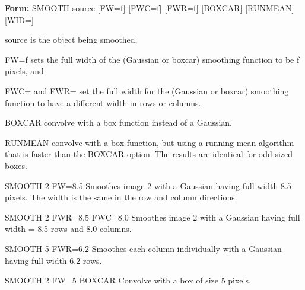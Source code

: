 {\newpage\clearpage
{}%
\begin{command}
  \item[\textbf{Form: }SMOOTH source {[FW=f]} {[FWC=f]} {[FWR=f]} 
       {[BOXCAR]} {[RUNMEAN]} {[WID=]}\hfill]{}
  \item[source]{is the object being smoothed,}
  \item[FW=f]{sets the full width of the (Gaussian or boxcar)
       smoothing function to be f pixels, and}
  \item[FWC= and FWR=]{set the full width for the (Gaussian or boxcar)
       smoothing function to have a different width in rows or columns.}
  \item[BOXCAR]{convolve with a box function instead of a Gaussian.}
  \item[RUNMEAN]{convolve with a box function, but using a
       running-mean algorithm that is faster than the BOXCAR option. 
       The results are identical for odd-sized boxes.}
\end{command}%
\lthtmlfigureZ
\lthtmlcheckvsize\clearpage}

{\newpage\clearpage
{}%
\begin{example}
  \item[SMOOTH 2 FW=8.5\hfill]{Smoothes image 2 with a Gaussian having
       full width 8.5 pixels.  The width is
       the same in the row and column directions.}
  \item[SMOOTH 2 FWR=8.5 FWC=8.0\hfill]{Smoothes image 2 with a Gaussian
       having full width = 8.5 rows and 8.0 columns.}
  \item[SMOOTH 5 FWR=6.2\hfill]{Smoothes each column individually with a
       Gaussian having full width 6.2 rows.}
  \item[SMOOTH 2 FW=5 BOXCAR\hfill]{Convolve with a box of size 5 pixels.}
\end{example}%
\lthtmlfigureZ
\lthtmlcheckvsize\clearpage}

